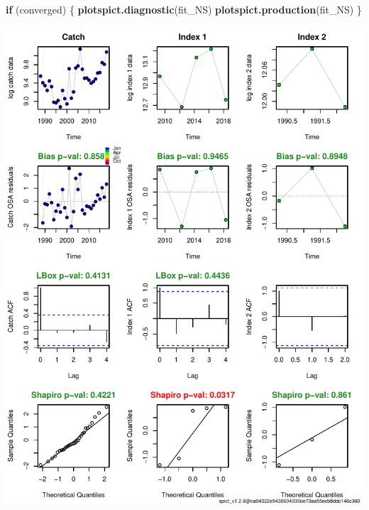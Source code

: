 \documentclass[
]{article}
\newenvironment{Shaded}{\begin{snugshade}}{\end{snugshade}}
\newcommand{\ControlFlowTok}[1]{\textcolor[rgb]{0.13,0.29,0.53}{\textbf{#1}}}
\newcommand{\KeywordTok}[1]{\textcolor[rgb]{0.13,0.29,0.53}{\textbf{#1}}}
\newcommand{\NormalTok}[1]{#1}
\begin{document}
\begin{Shaded}
\begin{Highlighting}[]
\ControlFlowTok{if}\NormalTok{ (converged) \{}
  \KeywordTok{plotspict.diagnostic}\NormalTok{(fit_NS)}
  \KeywordTok{plotspict.production}\NormalTok{(fit_NS)}
\NormalTok{\}}
\end{Highlighting}
\end{Shaded}

\includegraphics{aru.27.123a4_SPiCT_WD_files/figure-latex/diagnostics_scenario_3-1.pdf}
\end{document}
